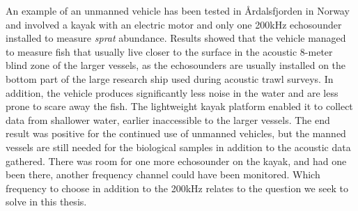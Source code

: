         An example of an unmanned vehicle has been tested in Årdalsfjorden in Norway and involved a kayak with an electric motor and only one 200kHz echosounder installed to measure \textit{sprat} abundance\cite{johnsen2020measuring}. Results showed that the vehicle managed to measure fish that usually live closer to the surface in the acoustic 8-meter blind zone of the larger vessels, as the echosounders are usually installed on the bottom part of the large research ship used during acoustic trawl surveys. In addition, the vehicle produces significantly less noise in the water and are less prone to scare away the fish. The lightweight kayak platform enabled it to collect data from shallower water, earlier inaccessible to the larger vessels. The end result was positive for the continued use of unmanned vehicles, but the manned vessels are still needed for the biological samples in addition to the acoustic data gathered. There was room for one more echosounder on the kayak, and had one been there, another frequency channel could have been monitored. Which frequency to choose in addition to the 200kHz relates to the question we seek to solve in this thesis.




